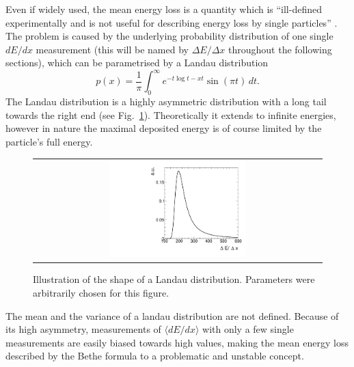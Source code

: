 Even if widely used, the mean energy loss is a quantity which is ``ill-defined experimentally and is not useful for describing energy loss by single particles'' \cite{bib:PDG_2014}.
The problem is caused by the underlying probability distribution of one single $dE/dx$ measurement (this will be named by $\Delta E/ \Delta x $ throughout the following sections), which can be parametrised by a Landau distribution \cite{bib:Landau_1944}
\begin{equation*}
p(x) = \frac{1}{\pi} \int_0^\infty\! e^{-t \log t - x t} \sin(\pi t)\, dt.
\end{equation*}
The Landau distribution is a highly asymmetric distribution with a long tail towards the right end (see Fig.~\ref{fig:landau}).
Theoretically it extends to infinite energies, however in nature the maximal deposited energy is of course limited by the particle's full energy.
\begin{figure}[!b]
  \centering 
  \begin{tabular}{c}
  \includegraphics[width=0.49\textwidth]{figures/analysis/Landau.pdf}
  \end{tabular}
  \caption{Illustration of the shape of a Landau distribution. Parameters were arbitrarily chosen for this figure.} 
  \label{fig:landau}
\end{figure}
The mean and the variance of a landau distribution are not defined.
Because of its high asymmetry, measurements of $\langle dE/dx \rangle$ with only a few single measurements are easily biased towards high values, making the mean energy loss described by the Bethe formula to a problematic and unstable concept. 


